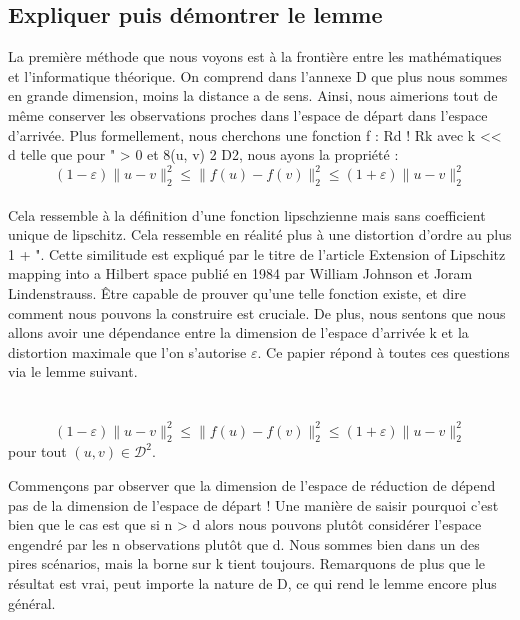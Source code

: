 \subsection{Expliquer puis démontrer le lemme}
La première méthode que nous voyons est à la frontière entre les mathématiques et l’informatique théorique. On comprend dans l’annexe D que plus nous sommes en grande dimension, moins la distance a de sens. Ainsi, nous aimerions tout de même conserver les observations proches dans l’espace de départ dans l’espace d’arrivée. Plus formellement, nous cherchons une fonction f : Rd ! Rk avec k << d telle que pour " > 0 et 8(u, v) 2 D2, nous ayons la propriété :
\\
\begin{equation*} (1-\varepsilon)\|u-v\|_2^2 \leqslant \|f(u)-f(v)\|_2^2 \leqslant (1+\varepsilon) \|u-v\|_2^2 \end{equation*}
\\
Cela ressemble à la définition d’une fonction lipschzienne mais sans coefficient unique de lipschitz. Cela ressemble en réalité plus à une distortion d’ordre au plus 1 + ". Cette similitude est expliqué par le titre de l’article Extension of Lipschitz mapping into a Hilbert space publié en 1984 par William Johnson et Joram Lindenstrauss. Être capable de prouver qu’une telle fonction existe, et dire comment nous pouvons la construire est cruciale. De plus, nous sentons que nous allons avoir une dépendance entre la dimension de l’espace d’arrivée k et la distortion maximale que l’on s’autorise $\varepsilon$. Ce papier répond à toutes ces questions via le lemme suivant.
\\
\\
\\
\begin{equation*} 
(1-\varepsilon)\|u-v\|_2^2 \leqslant \|f(u)-f(v)\|_2^2 \leqslant (1+\varepsilon) \|u-v\|_2^2 
\end{equation*}
pour tout $(u, v) \in \mathcal{D}^2$.


Commençons par observer que la dimension de l’espace de réduction de dépend pas de la dimension de l’espace de départ ! Une manière de saisir pourquoi c’est bien que le cas est que si n > d alors nous pouvons plutôt considérer l’espace engendré par les n observations plutôt que d. Nous sommes bien dans un des pires scénarios, mais la borne sur k tient toujours. Remarquons de plus que le résultat est vrai, peut importe la nature de D, ce qui rend le lemme encore plus général.


